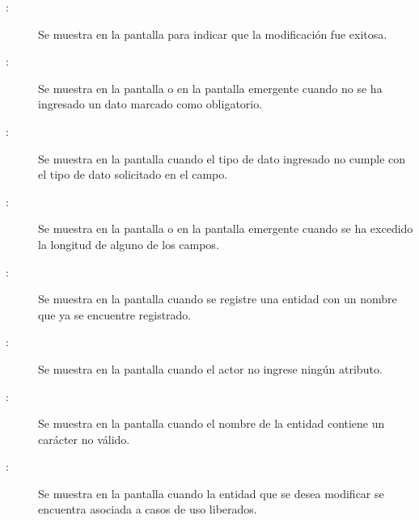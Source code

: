 	
\begin{description}
	\item[:] Se muestra en la pantalla  para indicar que la modificación fue exitosa.
	\item[:] Se muestra en la pantalla  o en la pantalla emergente  cuando no se ha ingresado un dato marcado como obligatorio.
	\item[:] Se muestra en la pantalla  cuando el tipo de dato ingresado no cumple con el tipo de dato solicitado en el campo.
	\item[:] Se muestra en la pantalla  o en la pantalla emergente  cuando se ha excedido la longitud de alguno de los campos.
	\item[:] Se muestra en la pantalla  cuando se registre una entidad con un nombre que ya se encuentre registrado.
	\item[:] Se muestra en la pantalla  cuando el actor no ingrese ningún atributo.
	\item[:] Se muestra en la pantalla  cuando el nombre de la entidad contiene un carácter no válido.
	\item[:] Se muestra en la pantalla  cuando la entidad que se desea modificar se encuentra asociada a casos de uso liberados.
	
\end{description}

